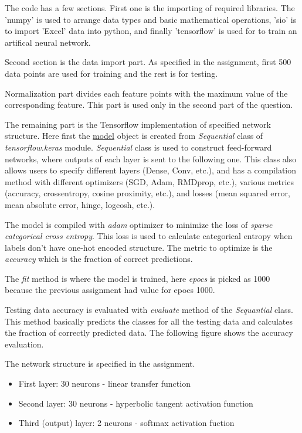 \documentclass[11pt]{article}
\begin{document}
The code has a few sections. First one is the importing of required libraries. The 'numpy' is used to arrange data types and basic mathematical operations, 'sio' is to import 'Excel' data into python, and finally 'tensorflow' is used for to train an artifical neural network. \medskip

Second section is the data import part. As specified in the assignment, first 500 data points are used for training and the rest is for testing. \medskip

Normalization part divides each feature points with the maximum value of the corresponding feature. This part is used only in the second part of the question. \medskip

The remaining part is the Tensorflow implementation of specified network structure. Here first the \underline{model} object is created from \emph{Sequential} class of \emph{tensorflow.keras} module. \emph{Sequential} class is used to construct feed-forward networks, where outputs of each layer is sent to the following one. This class also allows users to specify different layers (Dense, Conv, etc.), and has a compilation method with different optimizers (SGD, Adam, RMDprop, etc.), various metrics (accuracy, crossentropy, cosine proximity, etc.), and losses (mean squared error, mean absolute error, hinge, logcosh, etc.). \medskip

The model is compiled with \emph{adam} optimizer to minimize the loss of \emph{sparse categorical cross entropy}. This loss is used to calculate categorical entropy when labels don't have one-hot encoded structure. The metric to optimize is the \emph{accuracy} which is the fraction of correct predictions. \medskip

The \emph{fit} method is where the model is trained, here \emph{epocs} is picked as 1000 because the previous assignment had value for epocs 1000. \medskip

Testing data accuracy is evaluated with \emph{evaluate} method of the \emph{Sequantial} class. This method basically predicts the classes for all the testing data and calculates the fraction of correctly predicted data. The following figure shows the accuracy evaluation. \medskip

The network structure is specified in the assignment.
\begin{itemize}
    \item First layer: 30 neurons - linear transfer function
    \item Second layer: 30 neurons - hyperbolic tangent activation function
    \item Third (output) layer: 2 neurons -  softmax activation fuction
\end{itemize}
\end{document}
